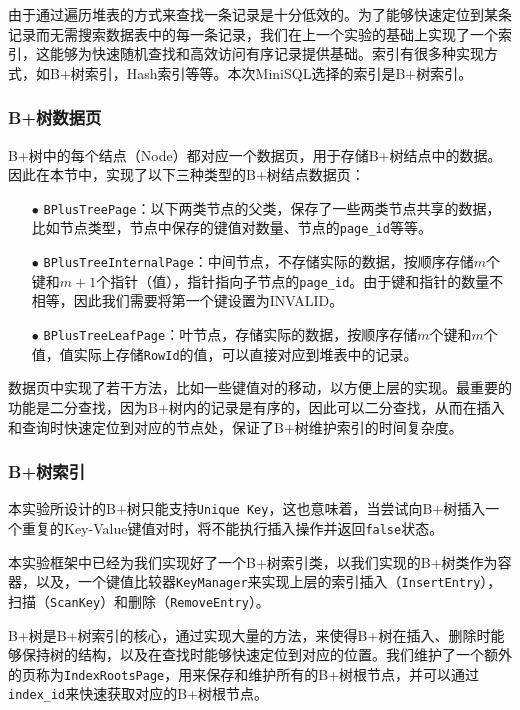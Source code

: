 \documentclass[12pt]{article}
\begin{document}
    由于通过遍历堆表的方式来查找一条记录是十分低效的。为了能够快速定位到某条记录而无需搜索数据表中的每一条记录，我们在上一个实验的基础上实现了一个索引，这能够为快速随机查找和高效访问有序记录提供基础。索引有很多种实现方式，如B+树索引，Hash索引等等。本次MiniSQL选择的索引是B+树索引。

    \subsubsection{B+树数据页}
    B+树中的每个结点（Node）都对应一个数据页，用于存储B+树结点中的数据。因此在本节中，实现了以下三种类型的B+树结点数据页：
    \begin{itemize}
        \item[$\bullet$] \texttt{BPlusTreePage}：以下两类节点的父类，保存了一些两类节点共享的数据，比如节点类型，节点中保存的键值对数量、节点的\texttt{page\_id}等等。
        \item[$\bullet$] \texttt{BPlusTreeInternalPage}：中间节点，不存储实际的数据，按顺序存储$m$个键和$m+1$个指针（值），指针指向子节点的\texttt{page\_id}。由于键和指针的数量不相等，因此我们需要将第一个键设置为INVALID。
        \item[$\bullet$] \texttt{BPlusTreeLeafPage}：叶节点，存储实际的数据，按顺序存储$m$个键和$m$个值，值实际上存储\texttt{RowId}的值，可以直接对应到堆表中的记录。
    \end{itemize}
    数据页中实现了若干方法，比如一些键值对的移动，以方便上层的实现。最重要的功能是二分查找，因为B+树内的记录是有序的，因此可以二分查找，从而在插入和查询时快速定位到对应的节点处，保证了B+树维护索引的时间复杂度。
    \subsubsection{B+树索引}
    本实验所设计的B+树只能支持\texttt{Unique Key}，这也意味着，当尝试向B+树插入一个重复的Key-Value键值对时，将不能执行插入操作并返回\texttt{false}状态。

    本实验框架中已经为我们实现好了一个B+树索引类，以我们实现的B+树类作为容器，以及，一个键值比较器\texttt{KeyManager}来实现上层的索引插入（\texttt{InsertEntry}），扫描（\texttt{ScanKey}）和删除（\texttt{RemoveEntry}）。

    B+树是B+树索引的核心，通过实现大量的方法，来使得B+树在插入、删除时能够保持树的结构，以及在查找时能够快速定位到对应的位置。我们维护了一个额外的页称为\texttt{IndexRootsPage}，用来保存和维护所有的B+树根节点，并可以通过\texttt{index\_id}来快速获取对应的B+树根节点。
    
\end{document}
